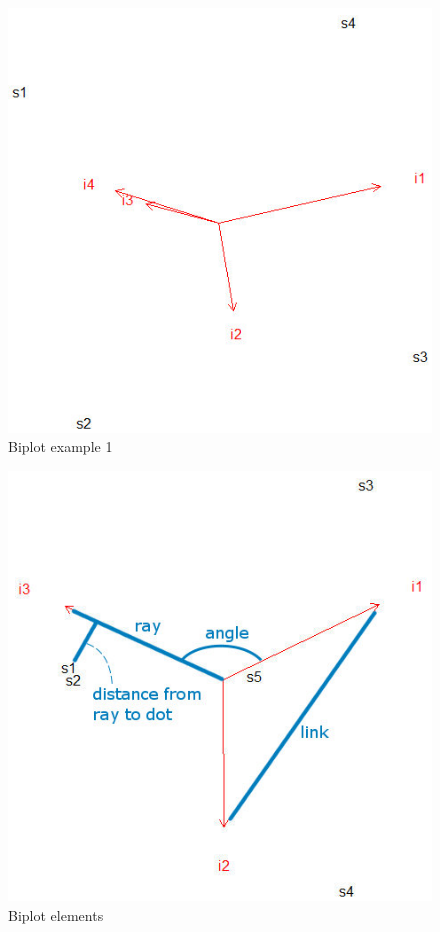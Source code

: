 \begin{figure}
\includegraphics[scale=0.5]{fig/biplot1}
\caption{\label{fig:Biplot-Example-1}Biplot example 1}
\end{figure}

\begin{figure}
\includegraphics[scale=0.5]{fig/biplot2}
\caption{\label{fig:Biplot-Elements}Biplot elements}
\end{figure}

